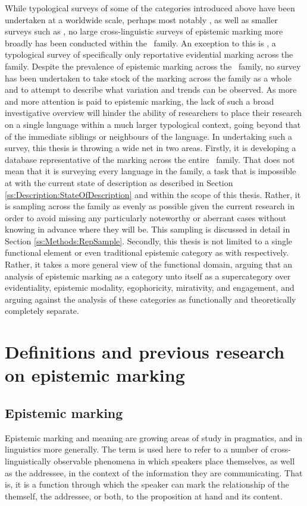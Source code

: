 While typological surveys of some of the categories introduced above have been undertaken at a worldwide scale, perhaps most notably , as well as smaller surveys such as , no large cross-linguistic surveys of epistemic marking more broadly has been conducted within the \lfam\ family. An exception to this is , a typological survey of specifically only reportative evidential marking across the family. Despite the prevalence of epistemic marking across the \lfam\ family, no survey has been undertaken to take stock of the marking across the family as a whole and to attempt to describe what variation and trends can be observed. As more and more attention is paid to epistemic marking, the lack of such a broad investigative overview will hinder the ability of researchers to place their research on a single language within a much larger typological context, going beyond that of the immediate siblings or neighbours of the language. In undertaking such a survey, this thesis is throwing a wide net in two areas. Firstly, it is developing a database representative of the marking across the entire \lfam\ family. That does not mean that it is surveying every language in the family, a task that is impossible at with the current state of description as described in Section \ref{ss:Description:StateOfDescription} and within the scope of this thesis. Rather, it is sampling across the family as evenly as possible given the current research in order to avoid missing any particularly noteworthy or aberrant cases without knowing in advance where they will be. This sampling is discussed in detail in Section \ref{ss:Methods:RepSample}. Secondly, this thesis is not limited to a single functional element or even traditional epistemic category as with  respectively. Rather, it takes a more general view of the functional domain, arguing that an analysis of epistemic marking as a category unto itself as a supercategory over evidentiality, epistemic modality, egophoricity, mirativity, and engagement, and arguing against the analysis of these categories as functionally and theoretically completely separate.

\section{Definitions and previous research on epistemic marking}\label{s:Intro:EpistemicIntro}
\subsection{Epistemic marking}
Epistemic marking and meaning are growing areas of study in pragmatics, and in linguistics more generally. The term is used here to refer to a number of cross-linguistically observable phenomena in which speakers place themselves, as well as the addressee, in the context of the information they are communicating. That is, it is a function through which the speaker can mark the relationship of the themself, the addressee, or both, to the proposition at hand and its content. 

